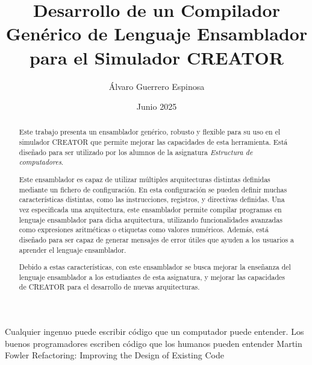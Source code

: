 \documentclass[es]{uc3mthesisIEEE}
\title{Desarrollo de un Compilador Genérico de Lenguaje Ensamblador para el Simulador CREATOR}
\author{Álvaro Guerrero Espinosa}
\date{Junio 2025}
\begin{document}
  \makecover


  \makeepigraph
    {Cualquier ingenuo puede escribir código que un computador puede entender. Los buenos programadores escriben código que los humanos pueden entender}  %
    {Martin Fowler}  %
    {Refactoring: Improving the Design of Existing Code}  %


  \begin{abstract}
    Este trabajo presenta un ensamblador genérico, robusto y flexible para su
    uso en el simulador CREATOR que permite mejorar las capacidades de esta
    herramienta. Está diseñado para ser utilizado por los alumnos de la
    asignatura \textit{Estructura de computadores}.

    Este ensamblador es capaz de utilizar múltiples arquitecturas distintas
    definidas mediante un fichero de configuración. En esta configuración se
    pueden definir muchas características distintas, como las instrucciones,
    registros, y directivas definidas. Una vez especificada una arquitectura,
    este ensamblador permite compilar programas en lenguaje ensamblador para
    dicha arquitectura, utilizando funcionalidades avanzadas como expresiones
    aritméticas o etiquetas como valores numéricos. Además, está diseñado para
    ser capaz de generar mensajes de error útiles que ayuden a los usuarios a
    aprender el lenguaje ensamblador.

    Debido a estas características, con este ensamblador se busca mejorar la
    enseñanza del lenguaje ensamblador a los estudiantes de esta asignatura, y
    mejorar las capacidades de CREATOR para el desarrollo de nuevas arquitecturas.

  \end{abstract}
\end{document}
